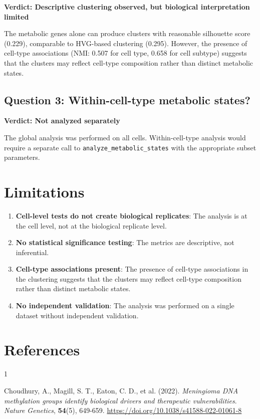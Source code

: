 \documentclass[11pt, a4paper]{article}
\begin{document}
\textbf{Verdict: Descriptive clustering observed, but biological interpretation limited}

The metabolic genes alone can produce clusters with reasonable silhouette score (0.229), comparable to HVG-based clustering (0.295). However, the presence of cell-type associations (NMI: 0.507 for cell type, 0.658 for cell subtype) suggests that the clusters may reflect cell-type composition rather than distinct metabolic states.

\subsection{Question 3: Within-cell-type metabolic states?}

\textbf{Verdict: Not analyzed separately}

The global analysis was performed on all cells. Within-cell-type analysis would require a separate call to \texttt{analyze\_metabolic\_states} with the appropriate subset parameters.

\section{Limitations}

\begin{enumerate}
    \item \textbf{Cell-level tests do not create biological replicates}: The analysis is at the cell level, not at the biological replicate level.
    \item \textbf{No statistical significance testing}: The metrics are descriptive, not inferential.
    \item \textbf{Cell-type associations present}: The presence of cell-type associations in the clustering suggests that the clusters may reflect cell-type composition rather than distinct metabolic states.
    \item \textbf{No independent validation}: The analysis was performed on a single dataset without independent validation.
\end{enumerate}

\section{References}

\begin{thebibliography}{1}

Choudhury, A., Magill, S. T., Eaton, C. D., et al. (2022). \textit{Meningioma DNA methylation groups identify biological drivers and therapeutic vulnerabilities}. \textit{Nature Genetics}, \textbf{54}(5), 649-659. \url{https://doi.org/10.1038/s41588-022-01061-8}

\end{thebibliography}
\end{document}
